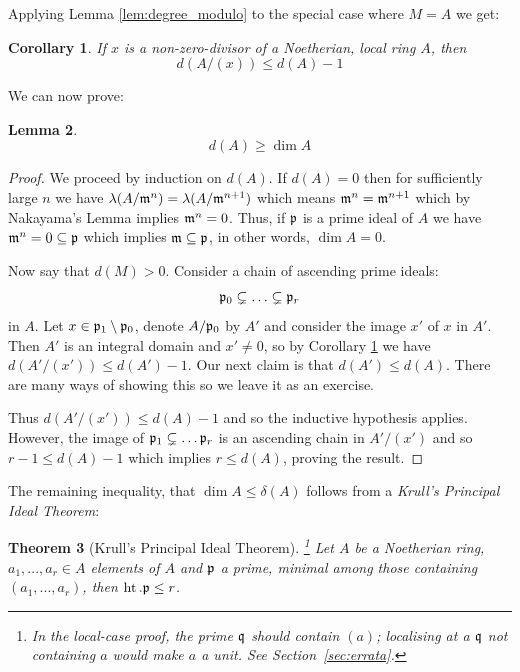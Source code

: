 \documentclass[12pt]{article}
\theoremstyle{plain}
\newtheorem{thm}{Theorem}[subsection] %
\newtheorem{lemma}[thm]{Lemma}
\newtheorem{cor}[thm]{Corollary}
\theoremstyle{definition}
\begin{document}
Applying Lemma \ref{lem:degree_modulo} to the special case where $M = A$ we get:
\begin{cor}
\label{cor:degree_ring_inductive_reduction}
If $x$ is a non-zero-divisor of a Noetherian, local ring $A$, then
\[d(A/(x)) \leq d(A) - 1\]
\end{cor}
We can now prove:
\begin{lemma}
\[d(A) \geq \operatorname{dim}A\]
\end{lemma}
\begin{proof}
We proceed by induction on $d(A)$. If $d(A) = 0$ then for sufficiently large $n$ we have $\lambda(A/\frak{m}^n) = \lambda(A/\frak{m}^{n+1})$ which means $\frak{m}^n = \frak{m}^{n+1}$ which by Nakayama's Lemma implies $\frak{m}^n = 0$. Thus, if $\frak{p}$ is a prime ideal of $A$ we have $\frak{m}^n = 0 \subseteq \frak{p}$ which implies $\frak{m} \subseteq \frak{p}$, in other words, $\operatorname{dim}A = 0$.

Now say that $d(M) > 0$. Consider a chain of ascending prime ideals:
\[\frak{p}_0 \subsetneq \hdots \subsetneq \frak{p}_r\]
in $A$. Let $x \in \frak{p}_1\setminus\frak{p}_0$, denote $A/\frak{p}_0$ by $A'$ and consider the image $x'$ of $x$ in $A'$. Then $A'$ is an integral domain and $x' \neq 0$, so by Corollary \ref{cor:degree_ring_inductive_reduction} we have $d(A'/(x')) \leq d(A') - 1$. Our next claim is that $d(A') \leq d(A)$. There are many ways of showing this so we leave it as an exercise.

Thus $d(A'/(x')) \leq d(A) - 1$ and so the inductive hypothesis applies. However, the image of $\frak{p}_1 \subsetneq \hdots \frak{p}_r$ is an ascending chain in $A'/(x')$ and so $r - 1 \leq d(A) - 1$ which implies $r \leq d(A)$, proving the result.
\end{proof}
The remaining inequality, that $\operatorname{dim}A \leq \delta(A)$ follows from a \emph{Krull's Principal Ideal Theorem}:
\begin{thm}[Krull's Principal Ideal Theorem]\footnote{In the local-case proof, the prime $\frak{q}$ should contain $(a)$; localising at a $\frak{q}$ not containing $a$ would make $a$ a unit. See Section~\ref{sec:errata}.}
Let $A$ be a Noetherian ring, $a_1,...,a_r \in A$ elements of $A$ and $\frak{p}$ a  prime, minimal among those containing $(a_1,...,a_r)$, then $\operatorname{ht}.\frak{p} \leq r$.
\end{thm}
\end{document}
